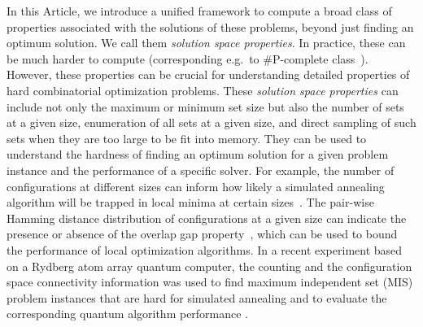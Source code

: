 \documentclass[onefignum, onetabnum]{siamart190516}
\newcommand{\<}{\langle}
\renewcommand{\>}{\rangle}
\newcounter{example}
\begin{document}
In this Article, we introduce a unified framework to compute a broad class of properties 
associated with the solutions of these problems, beyond just finding an optimum solution.
We call them \textit{solution space properties}. In practice, these can be much harder to compute (corresponding e.g.\ to \#P-complete class~\cite{Moore2011}). However, these properties can be crucial for understanding detailed properties of hard combinatorial optimization problems.
These \textit{solution space properties} can include not only the maximum or minimum set size but also the number of sets at a given size, enumeration of all sets at a given size, and direct sampling of such sets when they are too large to be fit into memory.
They can be used to understand the hardness of finding an optimum solution for a given problem instance and the performance of a specific solver.  
For example, the number of configurations at different sizes can inform how likely a simulated annealing algorithm will be trapped in local minima at certain sizes~\cite{Xu2018}.
The pair-wise Hamming distance distribution of configurations at a given size can indicate the presence or absence of the overlap gap property~\cite{Gamarnik2013, Gamarnik2019}, which can be used to bound the performance of local optimization algorithms.
In a recent experiment based on a Rydberg atom array quantum computer, 
the counting and the configuration space connectivity information was used to find maximum independent set (MIS) problem instances that are hard for simulated annealing and to evaluate the corresponding quantum algorithm performance \cite{Ebadi2022}.
\end{document}
